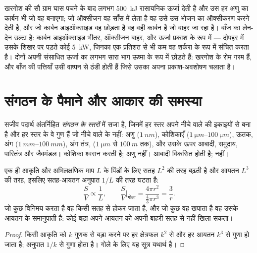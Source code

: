 \begin{example}[खरगोश और बाँज]\label{ex:b1:organism-environment:rabbitoak}
खरगोश की सौ ग्राम घास पचने के बाद लगभग \qty{500}{kJ} रासायनिक ऊर्जा
देती है और उस हर अणु का कार्बन भी जो वह बनाएगा; जो ऑक्सीजन वह साँस में
लेता है वह उसे उस भोजन का ऑक्सीकरण करने देती है, और जो कार्बन
डाइऑक्साइड वह छोड़ता है वह वही कार्बन है जो बाहर जा रहा है। बाँज का
लेन-देन उल्टा है: कार्बन डाइऑक्साइड भीतर, ऑक्सीजन बाहर, और ऊर्जा प्रकाश
के रूप में --- दोपहर में उसके शिखर पर पड़ते कोई \qty{5}{kW}, जिनका एक
प्रतिशत से भी कम वह शर्करा के रूप में संचित करता है। दोनों अपनी संसाधित
ऊर्जा का लगभग सारा भाग ऊष्मा के रूप में छोड़ते हैं: खरगोश के रोम गरम हैं,
और बाँज की पत्तियाँ उसी वाष्पन से ठंडी होती हैं जिसे उसका अपना
प्रकाश-अवशोषण चलाता है।
\end{example}

\section{संगठन के पैमाने और आकार की समस्या}

\begin{definition}[संगठन के स्तर]\label{def:b1:organism-environment:levels}
सजीव पदार्थ अंतर्निहित \emph{संगठन के स्तरों} में
सजा है, जिनमें हर स्तर अपने नीचे वाले की इकाइयों से बना है और हर स्तर के
वे गुण हैं जो नीचे वाले के नहीं: अणु ($\qty{1}{nm}$), कोशिकाएँ
($\qtyrange{1}{100}{\micro m}$), ऊतक, अंग ($\qtyrange{1}{100}{mm}$), अंग
तंत्र,  ($\qty{1}{\micro m}$ से $\qty{100}{m}$ तक), और उसके ऊपर
आबादी, समुदाय, पारितंत्र और जैवमंडल। कोशिका श्वसन करती है; अणु नहीं।
आबादी विकसित होती है;  नहीं।
\end{definition}

\begin{proposition}\label{prop:b1:organism-environment:sv}
एक ही आकृति और अभिलक्षणिक माप $L$ के पिंडों के लिए सतह $L^2$ की तरह
बढ़ती है और आयतन $L^3$ की तरह, इसलिए सतह-आयतन अनुपात $1/L$ की तरह
घटता है:
\[
\frac{S}{V} \propto \frac{1}{L}, \qquad
\frac{S}{V}\Big|_{\text{गोला}} = \frac{4\pi r^2}{\tfrac{4}{3}\pi r^3} = \frac{3}{r}.
\]
जो कुछ  विनिमय करता है वह किसी सतह से होकर जाता है, और जो कुछ वह
खपाता है वह उसके आयतन के समानुपाती है: कोई बड़ा  अपने आयतन को अपनी
बाहरी सतह से नहीं खिला सकता।
\end{proposition}
\begin{proof}
किसी आकृति को $k$ गुणक से बड़ा करने पर हर क्षेत्रफल $k^2$ से और हर आयतन
$k^3$ से गुणा हो जाता है; अनुपात $1/k$ से गुणा होता है। गोले के लिए यह
सूत्र यथार्थ है।
\end{proof}

